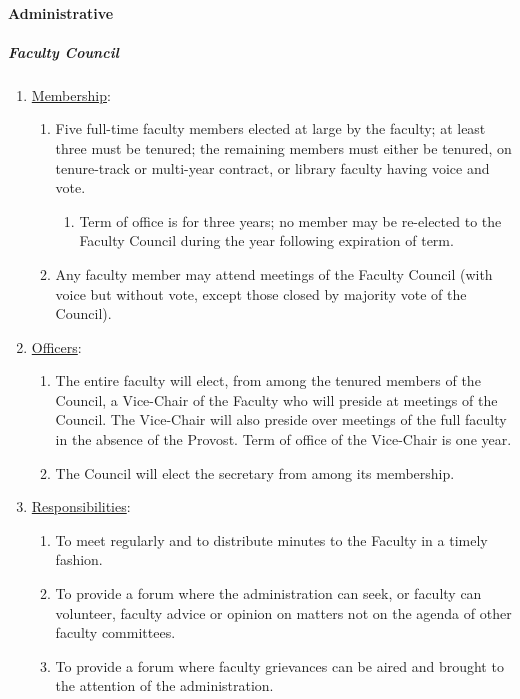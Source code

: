 			\paragraph{Administrative}
				\subparagraph{Faculty Council}
					\begin{enumerate}[label=\alph*)]
						\item{\underline{Membership}:
							\begin{enumerate}[label=\arabic*)]
								\item{Five full-time faculty members elected at large by the faculty; at least three must be tenured; the remaining members must either be tenured, on tenure-track or multi-year contract, or library faculty having voice and vote.
									\begin{enumerate}[label=(\alph*)]
										\item{Term of office is for three years; no member may be re-elected to the Faculty Council during the year following expiration of term.}
									\end{enumerate}
								}
								\item{Any faculty member may attend meetings of the Faculty Council (with voice but without vote, except those closed by majority vote of the Council).}
							\end{enumerate}
						}
						\item{\underline{Officers}:
							\begin{enumerate}[label=\arabic*)]
								\item{The entire faculty will elect, from among the tenured members of the Council, a Vice-Chair of the Faculty who will preside at meetings of the Council.  The Vice-Chair will also preside over meetings of the full faculty in the absence of the Provost.  Term of office of the Vice-Chair is one year.}
								\item{The Council will elect the secretary from among its membership.}
							\end{enumerate}
						}
						\item{\underline{Responsibilities}:
							\begin{enumerate}[label=\arabic*)]
								\item{To meet regularly and to distribute minutes to the Faculty in a timely fashion.}
								\item{To provide a forum where the administration can seek, or faculty can volunteer, faculty advice or opinion on matters not on the agenda of other faculty committees.}
								\item{To provide a forum where faculty grievances can be aired and brought to the attention of the administration.}

\end{enumerate}}
\end{enumerate}
